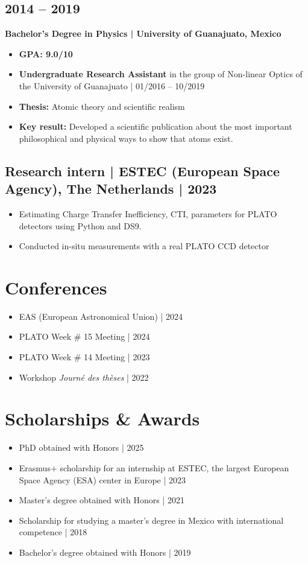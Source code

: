 \documentclass[11pt,a4paper]{article}
\begin{document}
\begin{multicols}{2}
		\subsection{2014 – 2019}
		\textbf{Bachelor's Degree in Physics | University of Guanajuato, Mexico}
		\begin{itemize}
			\item \textbf{GPA: 9.0/10}
			\item \textbf{Undergraduate Research Assistant} in the group of Non-linear Optics of the University of Guanajuato | 01/2016 – 10/2019
			\item \textbf{Thesis:} Atomic theory and scientific realism
			\item \textbf{Key result:} Developed a scientific publication about the most important philosophical and physical ways to show that atoms exist. 
		\end{itemize}
		
		\subsection{Research intern | ESTEC (European Space Agency), The Netherlands | 2023}
		\begin{itemize}
			\item Estimating Charge Transfer Inefficiency, CTI, parameters for PLATO detectors using Python and DS9.
			\item Conducted in-situ measurements with a real PLATO CCD detector
		\end{itemize}
	\end{multicols}
	
	\section{Conferences}

		\begin{itemize}
			\item EAS (European Astronomical Union) | 2024
			\item PLATO Week \# 15 Meeting | 2024
			\item PLATO Week \# 14 Meeting | 2023
			\item Workshop \textit{Journé des thèses} | 2022
		\end{itemize}

	
	\section{Scholarships \& Awards}
	\begin{itemize}
		\item PhD obtained with Honors | 2025
		\item Erasmus$+$ scholarship for an internship at ESTEC, the largest European Space Agency (ESA) center in Europe | 2023
		\item Master's degree obtained with Honors | 2021
		\item Scholarship for studying a master's degree in Mexico with international competence | 2018
		\item Bachelor's degree obtained with Honors | 2019
	\end{itemize}
	
\end{document}
